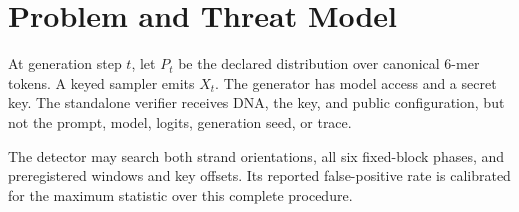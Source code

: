 \section{Problem and Threat Model}

At generation step $t$, let $P_t$ be the declared distribution over canonical 6-mer tokens. A keyed sampler emits $X_t$. The generator has model access and a secret key. The standalone verifier receives DNA, the key, and public configuration, but not the prompt, model, logits, generation seed, or trace.

The detector may search both strand orientations, all six fixed-block phases, and preregistered windows and key offsets. Its reported false-positive rate is calibrated for the maximum statistic over this complete procedure.

